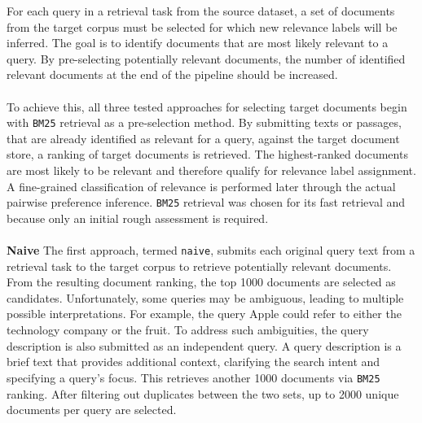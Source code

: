For each query in a retrieval task from the source dataset, a set of documents from the target corpus must be selected for which new relevance labels will be inferred. The goal is to identify documents that are most likely relevant to a query. By pre-selecting potentially relevant documents, the number of identified relevant documents at the end of the pipeline should be increased.
\\\\
To achieve this, all three tested approaches for selecting target documents begin with \texttt{BM25} retrieval as a pre-selection method. By submitting texts or passages, that are already identified as relevant for a query, against the target document store, a ranking of target documents is retrieved. The highest-ranked documents are most likely to be relevant and therefore qualify for relevance label assignment. A fine-grained classification of relevance is performed later through the actual pairwise preference inference. \texttt{BM25} retrieval was chosen for its fast retrieval and because only an initial rough assessment is required.
\\\\
\textbf{Naive} The first approach, termed \texttt{naive}, submits each original query text from a retrieval task to the target corpus to retrieve potentially relevant documents. From the resulting document ranking, the top 1000 documents are selected as candidates. Unfortunately, some queries may be ambiguous, leading to multiple possible interpretations. For example, the query \glqq Apple\grqq{} could refer to either the technology company or the fruit. To address such ambiguities, the query description is also submitted as an independent query. A query description is a brief text that provides additional context, clarifying the search intent and specifying a query's focus. This retrieves another 1000 documents via \texttt{BM25} ranking. After filtering out duplicates between the two sets, up to 2000 unique documents per query are selected.
\\\\
